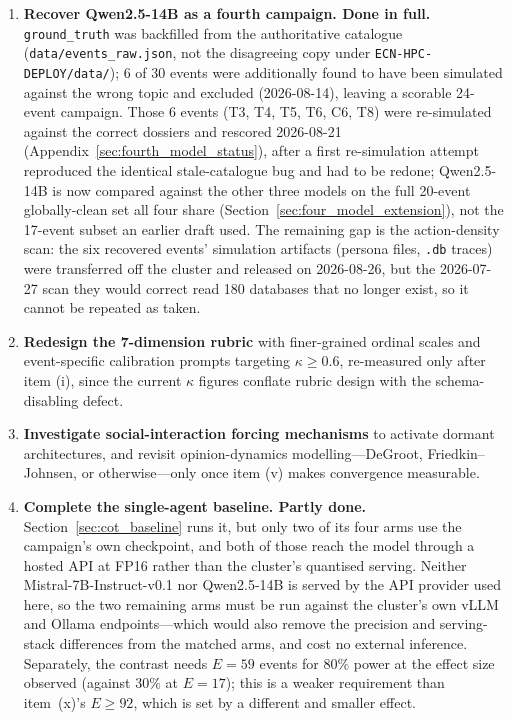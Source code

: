 \documentclass[11pt,journal,onecolumn]{IEEEtran}
\begin{document}
\begin{enumerate}
    \item[(xi)] \textbf{Recover Qwen2.5-14B as a fourth campaign. Done in full.} \texttt{ground\_truth} was backfilled from the authoritative catalogue (\texttt{data/events\_raw.json}, not the disagreeing copy under \texttt{ECN-HPC-DEPLOY/data/}); 6 of 30 events were additionally found to have been simulated against the wrong topic and excluded (2026-08-14), leaving a scorable 24-event campaign. Those 6 events (T3, T4, T5, T6, C6, T8) were re-simulated against the correct dossiers and rescored 2026-08-21 (Appendix~\ref{sec:fourth_model_status}), after a first re-simulation attempt reproduced the identical stale-catalogue bug and had to be redone; Qwen2.5-14B is now compared against the other three models on the full 20-event globally-clean set all four share (Section~\ref{sec:four_model_extension}), not the 17-event subset an earlier draft used. The remaining gap is the action-density scan: the six recovered events' simulation artifacts (persona files, \texttt{.db} traces) were transferred off the cluster and released on 2026-08-26, but the 2026-07-27 scan they would correct read 180 databases that no longer exist, so it cannot be repeated as taken.
    \item[(xii)] \textbf{Redesign the 7-dimension rubric} with finer-grained ordinal scales and event-specific calibration prompts targeting $\kappa \geq 0.6$, re-measured only after item (i), since the current $\kappa$ figures conflate rubric design with the schema-disabling defect.
    \item[(xiii)] \textbf{Investigate social-interaction forcing mechanisms} to activate dormant architectures, and revisit opinion-dynamics modelling---DeGroot, Friedkin--Johnsen, or otherwise---only once item (v) makes convergence measurable.
    \item[(xiv)] \textbf{Complete the single-agent baseline. Partly done.} Section~\ref{sec:cot_baseline} runs it, but only two of its four arms use the campaign's own checkpoint, and both of those reach the model through a hosted API at FP16 rather than the cluster's quantised serving. Neither Mistral-7B-Instruct-v0.1 nor Qwen2.5-14B is served by the API provider used here, so the two remaining arms must be run against the cluster's own vLLM and Ollama endpoints---which would also remove the precision and serving-stack differences from the matched arms, and cost no external inference. Separately, the contrast needs $E = 59$ events for $80\%$ power at the effect size observed (against $30\%$ at $E = 17$); this is a weaker requirement than item~(x)'s $E \geq 92$, which is set by a different and smaller effect.
\end{enumerate}
\end{document}
